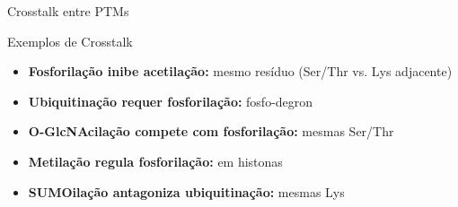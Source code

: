 \begin{frame}[shrink=10]{Crosstalk entre PTMs}

\vspace{0.3cm}

\begin{block}{Exemplos de Crosstalk}
\begin{itemize}
    \item \textbf{Fosforilação inibe acetilação:} mesmo resíduo (Ser/Thr vs. Lys adjacente)
    \item \textbf{Ubiquitinação requer fosforilação:} fosfo-degron
    \item \textbf{O-GlcNAcilação compete com fosforilação:} mesmas Ser/Thr
    \item \textbf{Metilação regula fosforilação:} em histonas
    \item \textbf{SUMOilação antagoniza ubiquitinação:} mesmas Lys
\end{itemize}
\end{block}

\vspace{0.3cm}

\end{frame}

